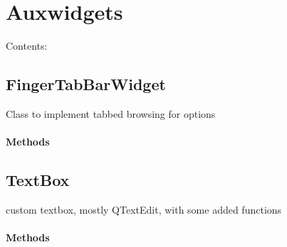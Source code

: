 \documentclass[letterpaper,10pt,english]{sphinxmanual}
\begin{document}
\section{Auxwidgets}
\label{Auxwidgets::doc}\label{Auxwidgets:auxwidgets}
Contents:


\subsection{FingerTabBarWidget}
\label{FingerTabBarWidget::doc}\label{FingerTabBarWidget:fingertabbarwidget}

\begin{fulllineitems}
\label{FingerTabBarWidget:Auxwidgets.FingerTabBarWidget}
Class to implement tabbed browsing for options
\paragraph{Methods}

\begin{fulllineitems}
\label{FingerTabBarWidget:Auxwidgets.FingerTabBarWidget.paintEvent}
\end{fulllineitems}


\begin{fulllineitems}
\label{FingerTabBarWidget:Auxwidgets.FingerTabBarWidget.tabSizeHint}
\end{fulllineitems}


\end{fulllineitems}



\subsection{TextBox}
\label{TextBox::doc}\label{TextBox:textbox}

\begin{fulllineitems}
\label{TextBox:Auxwidgets.TextBox}
custom textbox, mostly QTextEdit, with some added functions
\paragraph{Methods}

\begin{fulllineitems}
\label{TextBox:Auxwidgets.TextBox.output}
\end{fulllineitems}


\end{fulllineitems}
\end{document}
